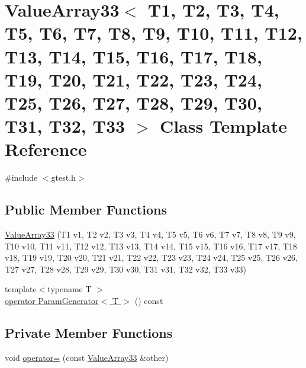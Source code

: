 \hypertarget{classtesting_1_1internal_1_1ValueArray33}{\section{\-Value\-Array33$<$ \-T1, \-T2, \-T3, \-T4, \-T5, \-T6, \-T7, \-T8, \-T9, \-T10, \-T11, \-T12, \-T13, \-T14, \-T15, \-T16, \-T17, \-T18, \-T19, \-T20, \-T21, \-T22, \-T23, \-T24, \-T25, \-T26, \-T27, \-T28, \-T29, \-T30, \-T31, \-T32, \-T33 $>$ \-Class \-Template \-Reference}
\label{d2/d5e/classtesting_1_1internal_1_1ValueArray33}
}


{\ttfamily \#include $<$gtest.\-h$>$}

\subsection*{\-Public \-Member \-Functions}
\begin{DoxyCompactItemize}
\item 
\hyperlink{classtesting_1_1internal_1_1ValueArray33_a991e7d1c079a7d09cbf2e6b3b35cab43}{\-Value\-Array33} (\-T1 v1, \-T2 v2, \-T3 v3, \-T4 v4, \-T5 v5, \-T6 v6, \-T7 v7, \-T8 v8, \-T9 v9, \-T10 v10, \-T11 v11, \-T12 v12, \-T13 v13, \-T14 v14, \-T15 v15, \-T16 v16, \-T17 v17, \-T18 v18, \-T19 v19, \-T20 v20, \-T21 v21, \-T22 v22, \-T23 v23, \-T24 v24, \-T25 v25, \-T26 v26, \-T27 v27, \-T28 v28, \-T29 v29, \-T30 v30, \-T31 v31, \-T32 v32, \-T33 v33)
\item 
{\footnotesize template$<$typename T $>$ }\\\hyperlink{classtesting_1_1internal_1_1ValueArray33_a08ef46fa12c9dd8ef6fc630baeea89b7}{operator Param\-Generator$<$ T $>$} () const 
\end{DoxyCompactItemize}
\subsection*{\-Private \-Member \-Functions}
\begin{DoxyCompactItemize}
\item 
void \hyperlink{classtesting_1_1internal_1_1ValueArray33_a90883bb1ec363c5d5c24b337c2a0b1ec}{operator=} (const \hyperlink{classtesting_1_1internal_1_1ValueArray33}{\-Value\-Array33} \&other)
\end{DoxyCompactItemize}
